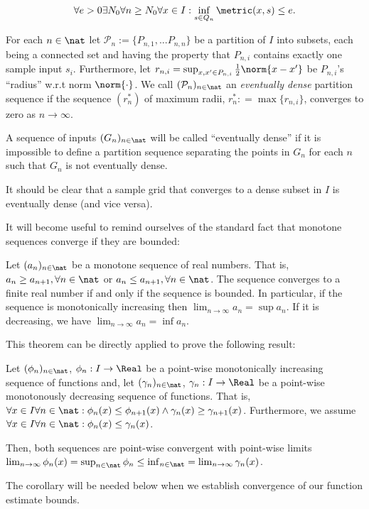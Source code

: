 \[\forall e > 0 \exists N_0 \forall n \geq N_0 \forall x \in I : \inf_{s \in Q_n} \metric(x,s) \leq e. \]


\begin{defn} 
For each $n \in \nat$ let $\mathcal P_n :=\{P_{n,1},...P_{n,n}\}$ be a partition of $I$ into subsets, each being a connected set and having the property that $P_{n,i}$ contains exactly one sample input $s_i$. Furthermore, let $r_{n,i} = \sup_{x,x' \in P_{n,i}} \frac{1}{2} \norm{x-x'}$ be $ P_{n,i}$'s ``radius'' w.r.t norm $\norm{\cdot}$. 
We call $(\mathcal P_n)_{n \in \nat}$ an \emph{eventually dense} partition sequence if the sequence $(r^*_n)$ of maximum radii, $r^*_n : = \max \{ r_{n,i} \}$, converges to zero as $n \to \infty$.

A sequence of inputs $(G_n)_{n \in \nat}$ will be called ``eventually dense'' if it is impossible to define a partition sequence separating the points in $G_n$ for each $n$ such that $G_n$ is not eventually dense.
\end{defn}
It should be clear that a sample grid that converges to a dense subset in $I$ is eventually dense (and vice versa).


It will become useful to remind ourselves of the standard fact that monotone sequences converge if they are bounded:
\begin{thm}
Let $(a_n)_{n \in \nat}$ be a monotone sequence of real numbers. That is, $a_n \geq a_{n+1}, \forall n \in \nat$ or $a_n \leq a_{n+1}, \forall n \in \nat$. The sequence converges to a finite real number if and only if the sequence is bounded. In particular, if the sequence is monotonically increasing then $\lim_{n \to \infty} a_n = \sup a_n$. If it is decreasing, we have $\lim_{n \to \infty} a_n = \inf a_n$.
\end{thm}
This theorem can be directly applied to prove the following result:
\begin{cor}
\label{cor:monseqfctsencl}
Let $(\phi_n)_{n \in \nat}$, $\phi_n : I \to \Real$ be a point-wise monotonically increasing sequence of functions and, let $(\gamma_n)_{n \in \nat}$, $\gamma_n : I \to \Real$ be a point-wise monotonously decreasing sequence of functions. That is, $\forall x \in I \forall n \in \nat: \phi_n(x) \leq \phi_{n+1}(x) \wedge \gamma_n(x) \geq \gamma_{n+1}(x) $. Furthermore, we assume $\forall x \in I \forall n \in \nat: \phi_n(x) \leq \gamma_{n}(x)$. 

Then, both sequences are point-wise convergent with point-wise limits 
$\lim_{n \to \infty} \phi_n (x) = \sup_{n \in \nat} \phi_n \leq \inf_{n \in \nat} = \lim_{n \to \infty} \gamma_n (x) $.
\end{cor}
The corollary will be needed below when we establish convergence of our function estimate bounds.

